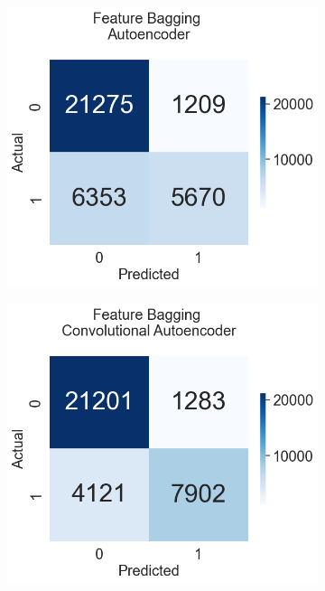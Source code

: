 \documentclass[a4paper,12pt]{report}
\theoremstyle{definitionNODot}
\begin{document}
	
	\begin{figure}[H]
		\centering
		\begin{subfigure}[b]{0.35\textwidth}
			\centering
			\includegraphics[width=\textwidth]{anomaly_by_ensemble_ensemble_autoencoder.png}
			
			\label{fig:anomaly_by_ensemble_ensemble_autoencoder}
		\end{subfigure}
		\hfil
		\begin{subfigure}[b]{0.35\textwidth}
			\centering
			\includegraphics[width=\textwidth]{anomaly_by_ensemble_ensemble_conv_ae.png}
			

\end{subfigure}
\end{figure}
\end{document}
